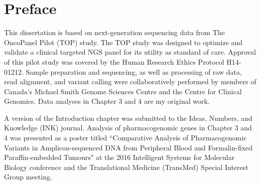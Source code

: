 
\chapter{Preface}

This dissertation is based on next-generation sequencing data from The OncoPanel Pilot (TOP) study. The TOP study was designed to optimize and validate a clinical targeted NGS panel for its utility as standard of care. Approval of this pilot study was covered by the Human Research Ethics Protocol H14-01212. Sample preparation and sequencing, as well as processing of raw data, read alignment, and variant calling were collaboratively performed by members of Canada's Michael Smith Genome Sciences Centre and the Centre for Clinical Genomics. Data analyses in Chapter 3 and 4 are my original work.

A version of the Introduction chapter was submitted to the Ideas, Numbers, and Knowledge (INK) journal. Analysis of pharmacogenomic genes in Chapter 3 and 4 was presented as a poster titled ``Comparative Analysis of Pharmacogenomic Variants in Amplicon-sequenced DNA from Peripheral Blood and Formalin-fixed Paraffin-embedded Tumours" at the 2016 Intelligent Systems for Molecular Biology conference and the Translational Medicine (TransMed) Special Interest Group meeting.
